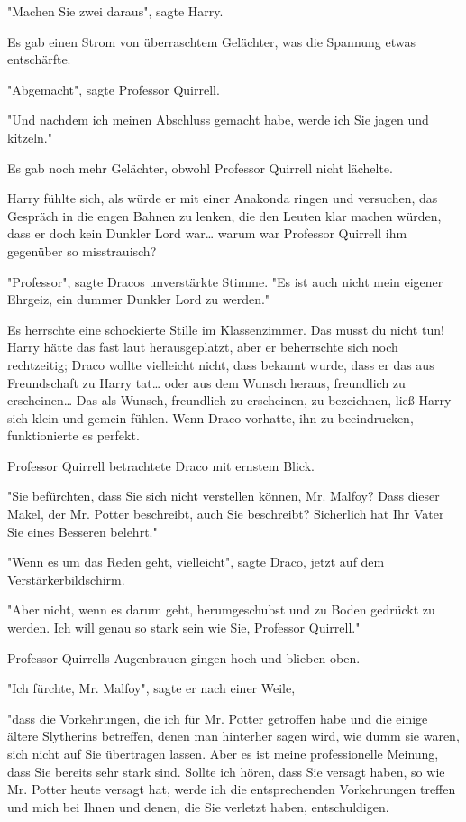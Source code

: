 {"Machen Sie zwei daraus", sagte Harry.

Es gab einen Strom von überraschtem Gelächter, was die Spannung etwas entschärfte.

"Abgemacht", sagte Professor Quirrell.

"Und nachdem ich meinen Abschluss gemacht habe, werde ich Sie jagen und kitzeln."

Es gab noch mehr Gelächter, obwohl Professor Quirrell nicht lächelte.

Harry fühlte sich, als würde er mit einer Anakonda ringen und versuchen, das Gespräch in die engen Bahnen zu lenken, die den Leuten klar machen würden, dass er doch kein Dunkler Lord war… warum war Professor Quirrell ihm gegenüber so misstrauisch?

"Professor", sagte Dracos unverstärkte Stimme. "Es ist auch nicht mein eigener Ehrgeiz, ein dummer Dunkler Lord zu werden."

Es herrschte eine schockierte Stille im Klassenzimmer. Das musst du nicht tun! Harry hätte das fast laut herausgeplatzt, aber er beherrschte sich noch rechtzeitig; Draco wollte vielleicht nicht, dass bekannt wurde, dass er das aus Freundschaft zu Harry tat… oder aus dem Wunsch heraus, freundlich zu erscheinen… Das als Wunsch, freundlich zu erscheinen, zu bezeichnen, ließ Harry sich klein und gemein fühlen. Wenn Draco vorhatte, ihn zu beeindrucken, funktionierte es perfekt.

Professor Quirrell betrachtete Draco mit ernstem Blick.

"Sie befürchten, dass Sie sich nicht verstellen können, Mr. Malfoy? Dass dieser Makel, der Mr. Potter beschreibt, auch Sie beschreibt? Sicherlich hat Ihr Vater Sie eines Besseren belehrt."

"Wenn es um das Reden geht, vielleicht", sagte Draco, jetzt auf dem Verstärkerbildschirm.

"Aber nicht, wenn es darum geht, herumgeschubst und zu Boden gedrückt zu werden. Ich will genau so stark sein wie Sie, Professor Quirrell."

Professor Quirrells Augenbrauen gingen hoch und blieben oben.

"Ich fürchte, Mr. Malfoy", sagte er nach einer Weile,

"dass die Vorkehrungen, die ich für Mr. Potter getroffen habe und die einige ältere Slytherins betreffen, denen man hinterher sagen wird, wie dumm sie waren, sich nicht auf Sie übertragen lassen. Aber es ist meine professionelle Meinung, dass Sie bereits sehr stark sind. Sollte ich hören, dass Sie versagt haben, so wie Mr. Potter heute versagt hat, werde ich die entsprechenden Vorkehrungen treffen und mich bei Ihnen und denen, die Sie verletzt haben, entschuldigen.

}
